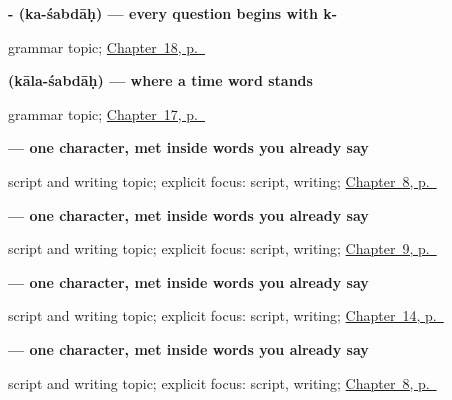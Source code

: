 \noindent\begin{minipage}[t]{\linewidth}
\raggedright
\textbf{- (ka-śabdāḥ) — every question begins with k-}\par
\footnotesize grammar topic; \hyperref[ch:sa-asking]{Chapter~18, p.~\pageref*{ch:sa-asking}}
\end{minipage}\par\smallskip

\noindent\begin{minipage}[t]{\linewidth}
\raggedright
\textbf{ (kāla-śabdāḥ) — where a time word stands}\par
\footnotesize grammar topic; \hyperref[ch:sa-time]{Chapter~17, p.~\pageref*{ch:sa-time}}
\end{minipage}\par\smallskip

\noindent\begin{minipage}[t]{\linewidth}
\raggedright
\textbf{ — one character, met inside words you already say}\par
\footnotesize script and writing topic; explicit focus: script, writing; \hyperref[ch:sa-mind-verbs]{Chapter~8, p.~\pageref*{ch:sa-mind-verbs}}
\end{minipage}\par\smallskip

\noindent\begin{minipage}[t]{\linewidth}
\raggedright
\textbf{ — one character, met inside words you already say}\par
\footnotesize script and writing topic; explicit focus: script, writing; \hyperref[ch:sa-doing-verbs]{Chapter~9, p.~\pageref*{ch:sa-doing-verbs}}
\end{minipage}\par\smallskip

\noindent\begin{minipage}[t]{\linewidth}
\raggedright
\textbf{ — one character, met inside words you already say}\par
\footnotesize script and writing topic; explicit focus: script, writing; \hyperref[ch:sa-pointing-and-asking]{Chapter~14, p.~\pageref*{ch:sa-pointing-and-asking}}
\end{minipage}\par\smallskip

\noindent\begin{minipage}[t]{\linewidth}
\raggedright
\textbf{ — one character, met inside words you already say}\par
\footnotesize script and writing topic; explicit focus: script, writing; \hyperref[ch:sa-mind-verbs]{Chapter~8, p.~\pageref*{ch:sa-mind-verbs}}
\end{minipage}\par\smallskip


